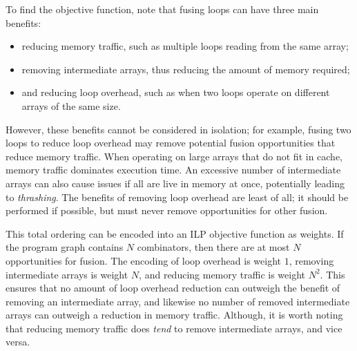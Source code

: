 To find the objective function, note that fusing loops can have three main benefits:
\begin{itemize}
\item
reducing memory traffic, such as multiple loops reading from the same array;
\item
removing intermediate arrays, thus reducing the amount of memory required;
\item
and reducing loop overhead, such as when two loops operate on different arrays of the same size.
\end{itemize}
However, these benefits cannot be considered in isolation; for example, fusing two loops to reduce loop overhead may remove potential fusion opportunities that reduce memory traffic.
When operating on large arrays that do not fit in cache, memory traffic dominates execution time.
An excessive number of intermediate arrays can also cause issues if all are live in memory at once, potentially leading to \emph{thrashing}.
The benefits of removing loop overhead are least of all; it should be performed if possible, but must never remove opportunities for other fusion.

This total ordering can be encoded into an ILP objective function as weights.
If the program graph contains $N$ combinators, then there are at most $N$ opportunities for fusion.
The encoding of loop overhead is weight $1$, removing intermediate arrays is weight $N$, and reducing memory traffic is weight $N^2$.
This ensures that no amount of loop overhead reduction can outweigh the benefit of removing an intermediate array,
and likewise no number of removed intermediate arrays can outweigh a reduction in memory traffic.
Although, it is worth noting that reducing memory traffic does \emph{tend} to remove intermediate arrays, and vice versa.

